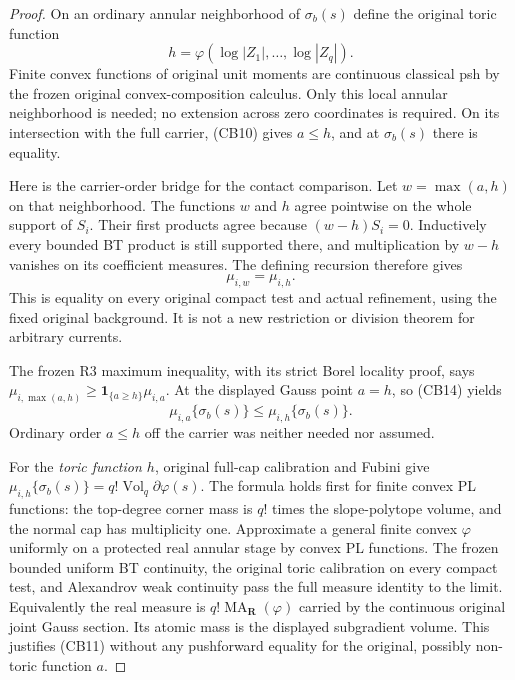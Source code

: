 \begin{proof}
On an ordinary annular neighborhood of $\sigma_b(s)$ define
the original toric function
\[
                           h=\varphi(\log|Z_1|,\ldots,\log|Z_q|).
 \tag{CB13}
\]
Finite convex functions of original unit moments are continuous
classical psh by the frozen original convex-composition
calculus. Only this local annular neighborhood is needed; no
extension across zero coordinates is required. On its intersection
with the full carrier, (CB10) gives $a\le h$, and at
$\sigma_b(s)$ there is equality.

Here is the carrier-order bridge for the contact comparison.
Let $w=\max(a,h)$ on that neighborhood. The functions $w$ and
$h$ agree pointwise on the whole support of $S_i$. Their first
products agree because $(w-h)S_i=0$. Inductively every bounded
BT product is still supported there, and multiplication by
$w-h$ vanishes on its coefficient measures. The defining
recursion therefore gives
\[
                             \mu_{i,w}=\mu_{i,h}.
 \tag{CB14}
\]
This is equality on every original compact test and actual
refinement, using the fixed original background. It is not a
new restriction or division theorem for arbitrary currents.

The frozen R3 maximum inequality, with its strict Borel locality
proof, says
$\mu_{i,\max(a,h)}\ge
\mathbf1_{\{a\ge h\}}\mu_{i,a}$.
At the displayed Gauss point $a=h$, so (CB14) yields
\[
                     \mu_{i,a}\{\sigma_b(s)\}
                            \le\mu_{i,h}\{\sigma_b(s)\}.
 \tag{CB15}
\]
Ordinary order $a\le h$ off the carrier was neither needed nor
assumed.

For the \emph{toric function $h$}, original full-cap calibration
and Fubini give
$\mu_{i,h}\{\sigma_b(s)\}
=q!\operatorname{Vol}_q\partial\varphi(s)$.
The formula holds first for finite convex PL functions: the
top-degree corner mass is $q!$ times the slope-polytope volume,
and the normal cap has multiplicity one. Approximate a general
finite convex $\varphi$ uniformly on a protected real annular
stage by convex PL functions. The frozen bounded uniform BT
continuity, the original toric calibration on every compact
test, and Alexandrov weak continuity pass the full measure
identity to the limit. Equivalently the real measure is
$q!\operatorname{MA}_{\mathbf R}(\varphi)$ carried by the
continuous original joint Gauss section. Its atomic mass is the
displayed subgradient volume. This justifies (CB11) without any
pushforward equality for the original, possibly non-toric
function $a$.
\end{proof}

